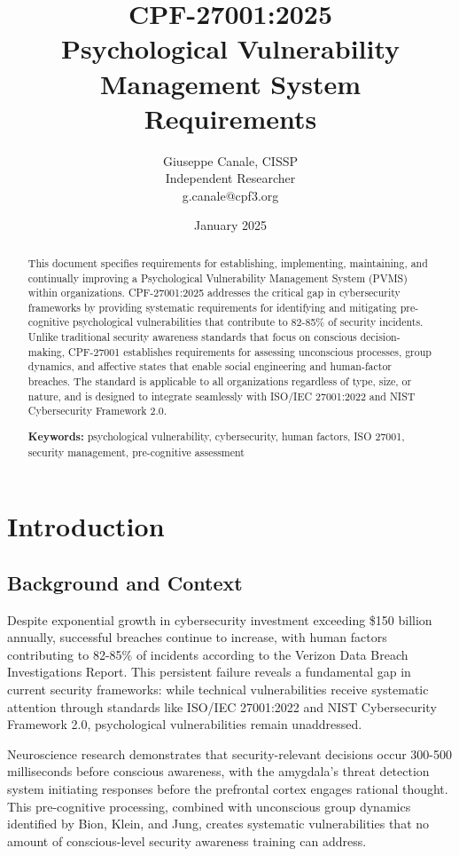 \documentclass[11pt,a4paper]{article}
\title{\textbf{CPF-27001:2025}\\
\large Psychological Vulnerability Management System\\
Requirements}
\author{Giuseppe Canale, CISSP\\
\small Independent Researcher\\
\small g.canale@cpf3.org}
\date{January 2025}
\begin{document}
\maketitle

\begin{abstract}
This document specifies requirements for establishing, implementing, maintaining, and continually improving a Psychological Vulnerability Management System (PVMS) within organizations. CPF-27001:2025 addresses the critical gap in cybersecurity frameworks by providing systematic requirements for identifying and mitigating pre-cognitive psychological vulnerabilities that contribute to 82-85\% of security incidents. Unlike traditional security awareness standards that focus on conscious decision-making, CPF-27001 establishes requirements for assessing unconscious processes, group dynamics, and affective states that enable social engineering and human-factor breaches. The standard is applicable to all organizations regardless of type, size, or nature, and is designed to integrate seamlessly with ISO/IEC 27001:2022 and NIST Cybersecurity Framework 2.0.

\textbf{Keywords:} psychological vulnerability, cybersecurity, human factors, ISO 27001, security management, pre-cognitive assessment
\end{abstract}

\tableofcontents
\newpage

\section{Introduction}

\subsection{Background and Context}

Despite exponential growth in cybersecurity investment exceeding \$150 billion annually, successful breaches continue to increase, with human factors contributing to 82-85\% of incidents according to the Verizon Data Breach Investigations Report. This persistent failure reveals a fundamental gap in current security frameworks: while technical vulnerabilities receive systematic attention through standards like ISO/IEC 27001:2022 and NIST Cybersecurity Framework 2.0, psychological vulnerabilities remain unaddressed.

Neuroscience research demonstrates that security-relevant decisions occur 300-500 milliseconds before conscious awareness, with the amygdala's threat detection system initiating responses before the prefrontal cortex engages rational thought. This pre-cognitive processing, combined with unconscious group dynamics identified by Bion, Klein, and Jung, creates systematic vulnerabilities that no amount of conscious-level security awareness training can address.
\end{document}
